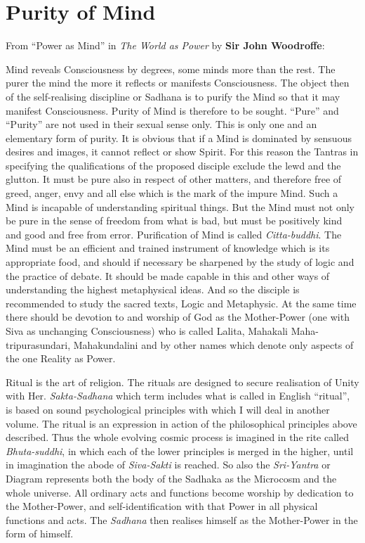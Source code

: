\section{Purity of Mind}

From ``Power as Mind'' in \textit{The World as Power} by \textbf{Sir John Woodroffe}:

\begin{quotationx}
Mind reveals Consciousness by degrees, some minds more than the rest. The purer the mind the more it reflects or manifests Consciousness. The object then of the self-realising discipline or Sadhana is to purify the Mind so that it may manifest Consciousness. Purity of Mind is therefore to be sought. ``Pure'' and ``Purity'' are not used in their sexual sense only. This is only one and an elementary form of purity. It is obvious that if a Mind is dominated by sensuous desires and images, it cannot reflect or show Spirit. For this reason the Tantras in specifying the qualifications of the proposed disciple exclude the lewd and the glutton. It must be pure also in respect of other matters, and therefore free of greed, anger, envy and all else which is the mark of the impure Mind. Such a Mind is incapable of understanding spiritual things. But the Mind must not only be pure in the sense of freedom from what is bad, but must be positively kind and good and free from error. Purification of Mind is called \emph{Citta-buddhi}. The Mind must be an efficient and trained instrument of knowledge which is its appropriate food, and should if necessary be sharpened by the study of logic and the practice of debate. It should be made capable in this and other ways of understanding the highest metaphysical ideas. And so the disciple is recommended to study the sacred texts, Logic and Metaphysic. At the same time there should be devotion to and worship of God as the Mother-Power (one with Siva as unchanging Consciousness) who is called Lalita, Mahakali Maha-tripurasundari, Mahakundalini and by other names which denote only aspects of the one Reality as Power.

Ritual is the art of religion. The rituals are designed to secure realisation of Unity with Her. \emph{Sakta-Sadhana} which term includes what is called in English ``ritual'', is based on sound psychological principles with which I will deal in another volume. The ritual is an expression in action of the philosophical principles above described. Thus the whole evolving cosmic process is imagined in the rite called \emph{Bhuta-suddhi}, in which each of the lower principles is merged in the higher, until in imagination the abode of \emph{Siva-Sakti} is reached. So also the \emph{Sri-Yantra} or Diagram represents both the body of the Sadhaka as the Microcosm and the whole universe. All ordinary acts and functions become worship by dedication to the Mother-Power, and self-identification with that Power in all physical functions and acts. The \emph{Sadhana} then realises himself as the Mother-Power in the form of himself.
\end{quotationx}




